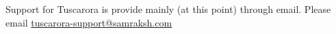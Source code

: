 Support for Tuscarora is provide mainly (at this point) through email. Please email \href{mailto: tuscarora-support@samraksh.com}{tuscarora-support@samraksh.com}
